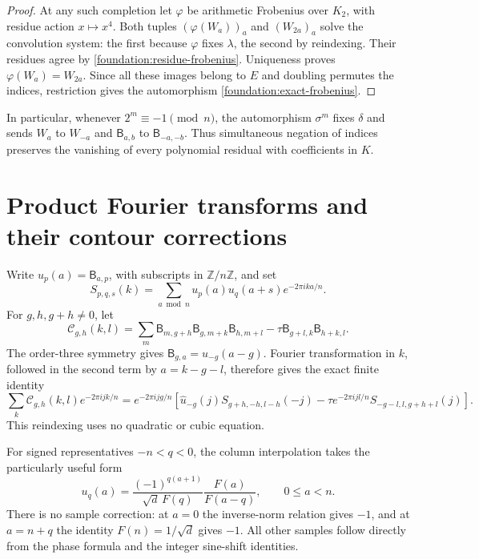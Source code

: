 \documentclass[11pt]{article}
\numberwithin{equation}{section}
\theoremstyle{definition}
\theoremstyle{remark}
\begin{document}
\begin{proof}
At any such completion let $\varphi$ be arithmetic Frobenius over
$K_2$, with residue action $x\mapsto x^4$. Both tuples
$(\varphi(W_a))_a$ and $(W_{2a})_a$ solve the convolution system:
the first because $\varphi$ fixes $\lambda$, the second by reindexing.
Their residues agree by \eqref{foundation:residue-frobenius}.
Uniqueness proves $\varphi(W_a)=W_{2a}$. Since all these images
belong to $E$ and doubling permutes the indices, restriction gives
the automorphism \eqref{foundation:exact-frobenius}.
\end{proof}

In particular, whenever $2^m\equiv-1\pmod n$, the automorphism
$\sigma^m$ fixes $\delta$ and sends $W_a$ to $W_{-a}$ and
$\mathsf B_{a,b}$ to $\mathsf B_{-a,-b}$. Thus simultaneous negation
of indices preserves the vanishing of every polynomial residual with
coefficients in $K$.
\section{Product Fourier transforms and their contour corrections}
\label{an:products}

Write $u_p(a)=\mathsf B_{a,p}$, with subscripts in $\mathbb Z/n\mathbb Z$, and set
\[
 S_{p,q,s}(k)=\sum_{a\bmod n}u_p(a)u_q(a+s)e^{-2\pi ika/n}.
\]
For $g,h,g+h\ne0$, let
\[
 \mathcal C_{g,h}(k,l)=\sum_m\mathsf B_{m,g+h}
    \mathsf B_{g,m+k}\mathsf B_{h,m+l}
       -\tau\mathsf B_{g+l,k}\mathsf B_{h+k,l}.
\]
The order-three symmetry gives $\mathsf B_{g,a}=u_{-g}(a-g)$.
Fourier transformation in $k$, followed in the second term by
$a=k-g-l$, therefore gives the exact finite identity
\begin{equation}
 \sum_k\mathcal C_{g,h}(k,l)e^{-2\pi ijk/n}
 =e^{-2\pi ijg/n}\left[
  \widehat u_{-g}(j)S_{g+h,-h,l-h}(-j)
       -\tau e^{-2\pi ijl/n}S_{-g-l,l,g+h+l}(j)\right].
 \label{an:finite}
\end{equation}
This reindexing uses no quadratic or cubic equation.

For signed representatives $-n<q<0$, the column interpolation takes
the particularly useful form
\begin{equation}
 u_q(a)=\frac{(-1)^{q(a+1)}}{\sqrt d\,F(q)}
                      \frac{F(a)}{F(a-q)},\qquad 0\le a<n.
 \label{an:signed}
\end{equation}
There is no sample correction: at $a=0$ the inverse-norm relation gives
$-1$, and at $a=n+q$ the identity $F(n)=1/\sqrt d$ gives $-1$.
All other samples follow directly from the phase formula and the
integer sine-shift identities.
\end{document}
